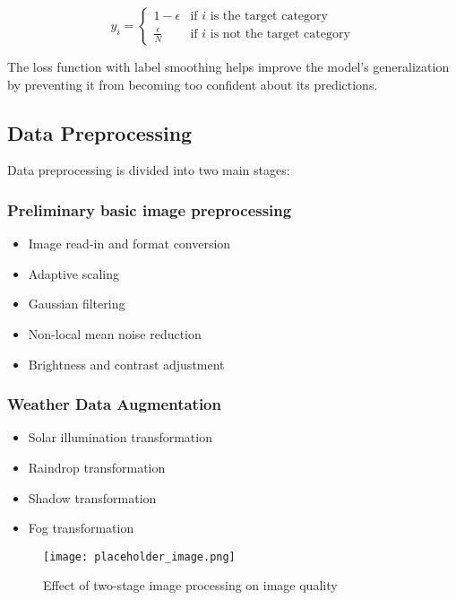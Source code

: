 \documentclass[12pt,a4paper]{article}
\begin{document}
\begin{equation}
y_i = 
\begin{cases} 
1 - \epsilon & \text{if } i \text{ is the target category} \\
\frac{\epsilon}{N} & \text{if } i \text{ is not the target category}
\end{cases}
\end{equation}

The loss function with label smoothing helps improve the model's generalization by preventing it from becoming too confident about its predictions.

\subsection{Data Preprocessing}
Data preprocessing is divided into two main stages:

\subsubsection{Preliminary basic image preprocessing}
\begin{itemize}
    \item Image read-in and format conversion
    \item Adaptive scaling
    \item Gaussian filtering
    \item Non-local mean noise reduction
    \item Brightness and contrast adjustment
\end{itemize}

\subsubsection{Weather Data Augmentation}
\begin{itemize}
    \item Solar illumination transformation
    \item Raindrop transformation
    \item Shadow transformation
    \item Fog transformation
\end{itemize}

\begin{figure}[H]
\centering
\texttt{[image: placeholder\_image.png]}
\caption{Effect of two-stage image processing on image quality}
\label{fig:image_processing}
\end{figure}
\end{document}
